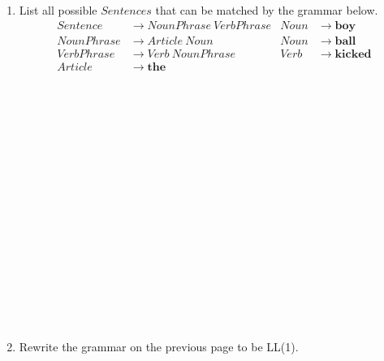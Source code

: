 \documentclass[10pt]{amsart}
\begin{document}
\begin{enumerate}
\item List all possible $Sentences$ that can be matched by the grammar below.
\begin{align*}
Sentence &\to NounPhrase\ VerbPhrase &     Noun &\to \mathbf{boy}\\
    NounPhrase &\to Article\ Noun    &   Noun &\to \mathbf{ball}\\
    VerbPhrase &\to Verb\ NounPhrase   &  Verb &\to \mathbf{kicked}\\
 Article &\to \mathbf{the}\\ 
\end{align*}
\begin{verbatim}
















\end{verbatim}
\item Rewrite the grammar on the previous page to be LL(1).
\end{enumerate}
\end{document}
